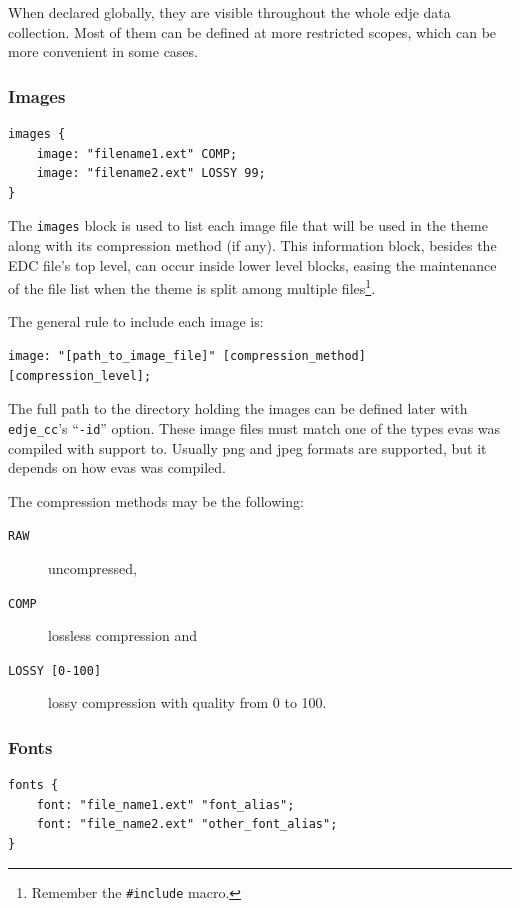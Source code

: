 \documentclass[a4paper]{profusion}
\begin{document}
When declared globally, they are visible throughout the whole edje
data collection. Most of them can be defined at more restricted
scopes, which can be more convenient in some cases.

\subsubsection{Images}

\begin{lstlisting}
images {
    image: "filename1.ext" COMP;
    image: "filename2.ext" LOSSY 99;
}
\end{lstlisting}

The \texttt{images} block is used to list each image file that will be
used in the theme along with its compression method (if any). This
information block, besides the EDC file's top level, can occur inside
lower level blocks, easing the maintenance of the file list when the
theme is split among multiple files\footnote{Remember the
  \texttt{\#include} macro.}.

The general rule to include each image is:

\begin{verbatim}
image: "[path_to_image_file]" [compression_method] [compression_level];
\end{verbatim}

The full path to the directory holding the images can be defined later
with \texttt{edje\_cc}'s ``\texttt{-id}'' option. These image files
must match one of the types evas was compiled with support to.
Usually png and jpeg formats are supported, but it depends on how evas
was compiled.

 The compression methods may be the following:

\begin{description}
\item[\texttt{RAW}] uncompressed,
\item[\texttt{COMP}] lossless compression and
\item[\texttt{LOSSY [0-100]}] lossy compression with quality from 0 to
 100.
\end{description}

\subsubsection{Fonts}

\begin{lstlisting}
fonts {
    font: "file_name1.ext" "font_alias";
    font: "file_name2.ext" "other_font_alias";
}
\end{lstlisting}
\end{document}
